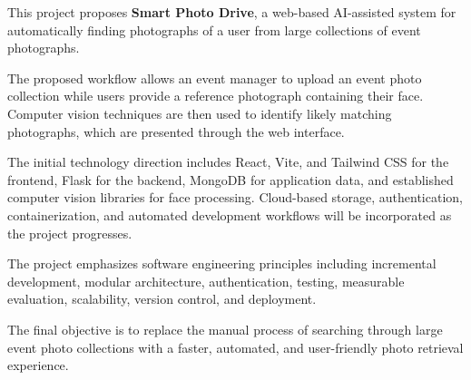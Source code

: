 \documentclass[11pt,a4paper]{article}
\begin{document}
This project proposes \textbf{Smart Photo Drive}, a web-based
AI-assisted system for automatically finding photographs of a user
from large collections of event photographs.

The proposed workflow allows an event manager to upload an event photo
collection while users provide a reference photograph containing their
face. Computer vision techniques are then used to identify likely
matching photographs, which are presented through the web interface.

The initial technology direction includes React, Vite, and Tailwind
CSS for the frontend, Flask for the backend, MongoDB for application
data, and established computer vision libraries for face processing.
Cloud-based storage, authentication, containerization, and automated
development workflows will be incorporated as the project progresses.

The project emphasizes software engineering principles including
incremental development, modular architecture, authentication,
testing, measurable evaluation, scalability, version control, and
deployment.

The final objective is to replace the manual process of searching
through large event photo collections with a faster, automated, and
user-friendly photo retrieval experience.
\end{document}
